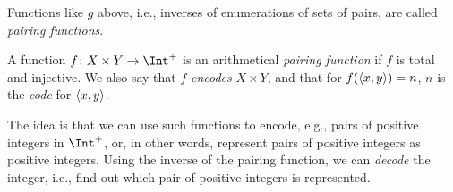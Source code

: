 \documentclass[../../../include/open-logic-section]{subfiles}
\begin{document}
Functions like $g$ above, i.e., inverses of enumerations of sets of pairs, are called \emph{pairing functions}.

\begin{defn}
A function $f\colon X \times Y \to \Int^+$ is an arithmetical \emph{pairing function} if $f$ is total and injective. We also say that $f$ \emph{encodes} $X \times Y$, and that for $f(\langle x,y \rangle)=n$, $n$ is the \emph{code} for $\langle x,y \rangle$.
\end{defn}

\begin{explain}
The idea is that we can use such functions to encode, e.g., pairs of positive integers in $\Int^+$, or, in other words, represent pairs of positive integers as positive integers. Using the inverse of the pairing function, we can \emph{decode} the integer, i.e., find out which pair of positive integers is represented.


\end{explain}
\end{document}
